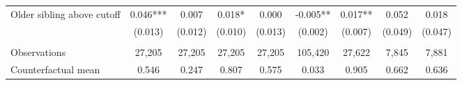 {{\begin{tabular}{lcccccccc}
Older sibling above cutoff&       0.046***&       0.007   &       0.018*  &       0.000   &      -0.005** &       0.017** &       0.052   &       0.018   \\
                    &     (0.013)   &     (0.012)   &     (0.010)   &     (0.013)   &     (0.002)   &     (0.007)   &     (0.049)   &     (0.047)   \\
                    &               &               &               &               &               &               &               &               \\
Observations        &      27,205   &      27,205   &      27,205   &      27,205   &     105,420   &      27,622   &       7,845   &       7,881   \\
Counterfactual mean &       0.546   &       0.247   &       0.807   &       0.575   &       0.033   &       0.905   &       0.662   &       0.636   \\
 

\bottomrule
\end{tabular}
}
}
